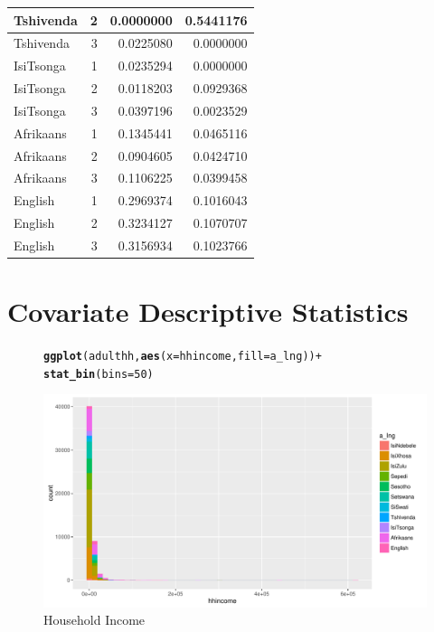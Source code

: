\documentclass[a4paper,british]{article}\usepackage[]{graphicx}\usepackage[]{color}
\makeatletter
\def\maxwidth{ %
  \ifdim\Gin@nat@width>\linewidth
    \linewidth
  \else
    \Gin@nat@width
  \fi
}
\newcommand{\hlnum}[1]{\textcolor[rgb]{0.686,0.059,0.569}{#1}}%
\newcommand{\hlopt}[1]{\textcolor[rgb]{0,0,0}{#1}}%
\newcommand{\hlstd}[1]{\textcolor[rgb]{0.345,0.345,0.345}{#1}}%
\newcommand{\hlkwc}[1]{\textcolor[rgb]{0.333,0.667,0.333}{#1}}%
\newcommand{\hlkwd}[1]{\textcolor[rgb]{0.737,0.353,0.396}{\textbf{#1}}}%
\newenvironment{kframe}{%
 \def\at@end@of@kframe{}%
 \ifinner\ifhmode%
  \def\at@end@of@kframe{\end{minipage}}%
  \begin{minipage}{\columnwidth}%
 \fi\fi%
 \def\FrameCommand##1{\hskip\@totalleftmargin \hskip-\fboxsep
 \colorbox{shadecolor}{##1}\hskip-\fboxsep
     \hskip-\linewidth \hskip-\@totalleftmargin \hskip\columnwidth}%
 \MakeFramed {\advance\hsize-\width
   \@totalleftmargin\z@ \linewidth\hsize
   \@setminipage}}%
 {\par\unskip\endMakeFramed%
 \at@end@of@kframe}
\newenvironment{knitrout}{}{} %
\makeatother
\begin{document}
\begin{table}[H]
\begin{knitrout}
\begin{tabular}{l|r|r|r}
Tshivenda & 2 & 0.0000000 & 0.5441176\\
\hline
Tshivenda & 3 & 0.0225080 & 0.0000000\\
\hline
IsiTsonga & 1 & 0.0235294 & 0.0000000\\
\hline
IsiTsonga & 2 & 0.0118203 & 0.0929368\\
\hline
IsiTsonga & 3 & 0.0397196 & 0.0023529\\
\hline
Afrikaans & 1 & 0.1345441 & 0.0465116\\
\hline
Afrikaans & 2 & 0.0904605 & 0.0424710\\
\hline
Afrikaans & 3 & 0.1106225 & 0.0399458\\
\hline
English & 1 & 0.2969374 & 0.1016043\\
\hline
English & 2 & 0.3234127 & 0.1070707\\
\hline
English & 3 & 0.3156934 & 0.1023766\\
\hline
\end{tabular}
\end{knitrout}
\end{table}


\section{Covariate Descriptive Statistics}

\begin{figure}[H]
\caption{Household Income}

\label{fig:hhincome}

\begin{knitrout}
\color{fgcolor}\begin{kframe}
\begin{alltt}
\hlkwd{ggplot}\hlstd{(adulthh,} \hlkwd{aes}\hlstd{(}\hlkwc{x}\hlstd{=hhincome,} \hlkwc{fill}\hlstd{=a_lng ))} \hlopt{+}
    \hlkwd{stat_bin}\hlstd{(}\hlkwc{bins}\hlstd{=}\hlnum{50}\hlstd{)}
\end{alltt}
\end{kframe}
\includegraphics[width=\maxwidth]{../Making-Next-Billion-Demand-Access/misc/latex-hhincome-1} 

\end{knitrout}
\end{figure}
\end{document}

